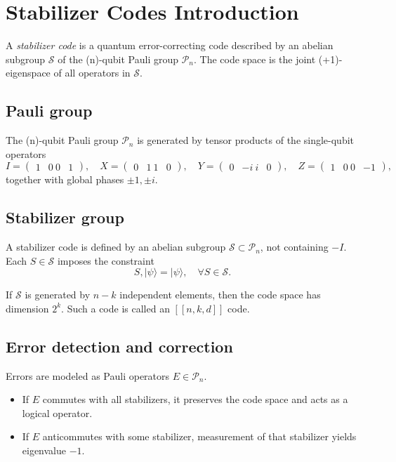 \Contributor{}

\lstset{style=mystyle}


	\MakeScribeTop

\section{Stabilizer Codes Introduction}

A \emph{stabilizer code} is a quantum error-correcting code described by an abelian subgroup
\(\mathcal{S}\) of the (n)-qubit Pauli group \(\mathcal{P}_n\). The code space is the joint
(+1)-eigenspace of all operators in \(\mathcal{S}\).

\subsection*{Pauli group}
The (n)-qubit Pauli group \(\mathcal{P}_n\) is generated by tensor products of the single-qubit operators
\[
I = \begin{pmatrix}1 & 0 \ 0 & 1\end{pmatrix}, \quad
X = \begin{pmatrix}0 & 1 \ 1 & 0\end{pmatrix}, \quad
Y = \begin{pmatrix}0 & -i \ i & 0\end{pmatrix}, \quad
Z = \begin{pmatrix}1 & 0 \ 0 & -1\end{pmatrix},
\]
together with global phases \({\pm 1, \pm i}\).

\subsection*{Stabilizer group}
A stabilizer code is defined by an abelian subgroup \(\mathcal{S} \subset \mathcal{P}_n\), not containing \(-I\).
Each \(S \in \mathcal{S}\) imposes the constraint
\[
S , |\psi\rangle = |\psi\rangle, \quad \forall S \in \mathcal{S}.
\]

If \(\mathcal{S}\) is generated by \(n-k\) independent elements, then the code space has dimension \(2^k\). Such a code is called an \([[n,k,d]]\) code.

\subsection*{Error detection and correction}
Errors are modeled as Pauli operators \(E \in \mathcal{P}_n\).
\begin{itemize}
\item If \(E\) commutes with all stabilizers, it preserves the code space and acts as a logical operator.
\item If \(E\) anticommutes with some stabilizer, measurement of that stabilizer yields eigenvalue \(-1\).
\end{itemize}

